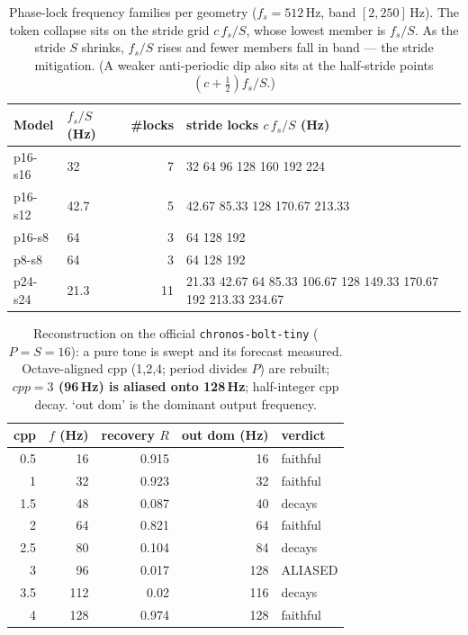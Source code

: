 \begin{table}[!ht]
  \centering
  \footnotesize
  \begin{tabular}{@{}llrp{7.2cm}@{}}
    \toprule
    Model & $f_s/S$ (Hz) & \#locks & stride locks $c\,f_s/S$ (Hz) \\
    \midrule
    p16-s16 & 32 & 7 & 32 64 96 128 160 192 224 \\
    p16-s12 & 42.7 & 5 & 42.67 85.33 128 170.67 213.33 \\
    p16-s8 & 64 & 3 & 64 128 192 \\
    p8-s8 & 64 & 3 & 64 128 192 \\
    p24-s24 & 21.3 & 11 & 21.33 42.67 64 85.33 106.67 128 149.33 170.67 192 213.33 234.67 \\
    \bottomrule
  \end{tabular}
  \caption{Phase-lock frequency families per geometry ($f_s=512$\,Hz, band $[2,250]$\,Hz). The token collapse sits on the stride grid $c\,f_s/S$, whose lowest member is $f_s/S$. As the stride $S$ shrinks, $f_s/S$ rises and fewer members fall in band --- the stride mitigation. (A weaker anti-periodic dip also sits at the half-stride points $(c{+}\tfrac12)f_s/S$.)}
  \label{tab:flock}
\end{table}

\begin{table}[!ht]
  \centering
  \footnotesize
  \begin{tabular}{rrrrl}
    \toprule
    cpp & $f$ (Hz) & recovery $R$ & out dom (Hz) & verdict \\
    \midrule
    0.5 & 16 & 0.915 & 16 & faithful \\
    1 & 32 & 0.923 & 32 & faithful \\
    1.5 & 48 & 0.087 & 40 & decays \\
    2 & 64 & 0.821 & 64 & faithful \\
    2.5 & 80 & 0.104 & 84 & decays \\
    3 & 96 & 0.017 & 128 & ALIASED \\
    3.5 & 112 & 0.02 & 116 & decays \\
    4 & 128 & 0.974 & 128 & faithful \\
    \bottomrule
  \end{tabular}
  \caption{Reconstruction on the official \texttt{chronos-bolt-tiny} ($P{=}S{=}16$): a pure tone is swept and its forecast measured. Octave-aligned cpp (1,2,4; period divides $P$) are rebuilt; \textbf{$cpp{=}3$ (96\,Hz) is aliased onto 128\,Hz}; half-integer cpp decay. `out dom' is the dominant output frequency.}
  \label{tab:recon}
\end{table}

